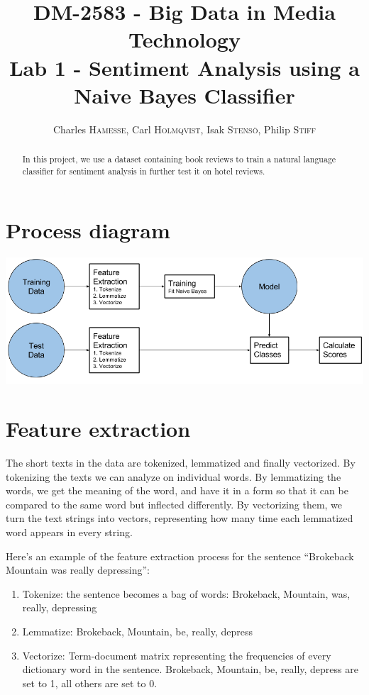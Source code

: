 \documentclass[a4paper,10pt]{article}
\title{DM-2583 - Big Data in Media Technology\\Lab 1 - Sentiment Analysis using a Naive Bayes Classifier}
\date{\vspace{-7ex}
Charles \textsc{Hamesse},
Carl \textsc{Holmqvist},
Isak \textsc{Stensö},
Philip \textsc{Stiff}
}
\begin{document}
\maketitle

%
\begin{abstract}
    In this project, we use a dataset containing book reviews to train a natural language classifier for sentiment analysis in further test it on hotel reviews.
    \vspace{2ex}
\end{abstract}
\vspace{-5ex}
%
\section{Process diagram}
\begin{center}
	\includegraphics[width=.6\textwidth]{diagram}
\end{center}

%
\section{Feature extraction}
The short texts in the data are tokenized, lemmatized and finally vectorized. By tokenizing the texts we can analyze on individual words. By lemmatizing the words, we get the meaning of the word, and have it in a form so that it can be compared to the same word but inflected differently. By vectorizing them, we turn the text strings into vectors, representing how many time each lemmatized word appears in every string.

Here’s an example of the feature extraction process for the sentence “Brokeback Mountain was really depressing”:
\begin{enumerate}
	\item Tokenize: the sentence becomes a bag of words: Brokeback, Mountain, was, really, depressing
	\item Lemmatize: Brokeback, Mountain, be, really, depress
	\item Vectorize: Term-document matrix representing the frequencies of every dictionary word in the sentence. Brokeback, Mountain, be, really, depress are set to 1, all others are set to 0.
\end{enumerate}
\end{document}
